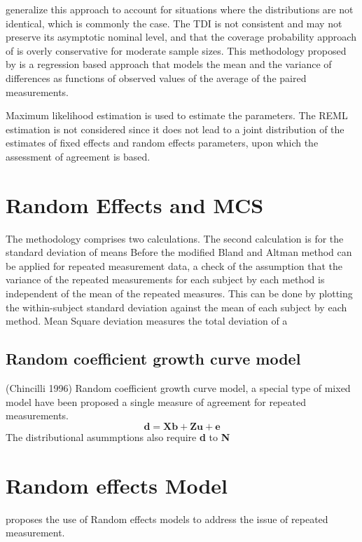 \documentclass[12pt, a4paper]{report}
\theoremstyle{plain}
\theoremstyle{definition}
\theoremstyle{remark}
\begin{document}
\newpage






\citet{pkcng} generalize this approach to account for situations
where the distributions are not identical, which is commonly the
case. The TDI is not consistent and may not preserve its
asymptotic nominal level, and that the coverage probability
approach of \citet{lin2002} is overly conservative for moderate
sample sizes. This methodology proposed by \citet{pkcng} is a
regression based approach that models the mean and the variance of
differences as functions of observed values of the average of the
paired measurements.

Maximum likelihood estimation is used to estimate the parameters.
The REML estimation is not considered since it does not lead to a
joint distribution of the estimates of fixed effects and random
effects parameters, upon which the assessment of agreement is
based.

\section{Random Effects and MCS}
The methodology comprises two calculations. The second calculation
is for the standard deviation of means Before the modified Bland
and Altman method can be applied for repeated measurement data, a
check of the assumption that the variance of the repeated
measurements for each subject by each method is independent of the
mean of the repeated measures. This can be done by plotting the
within-subject standard deviation against the mean of each subject
by each method. Mean Square deviation measures the total deviation
of a


\subsection{Random coefficient growth curve model} (Chincilli
1996) Random coefficient growth curve model, a special type of
mixed model have been proposed a single measure of agreement for
repeated measurements.
\begin{equation}
\textbf{d}= \textbf{Xb} + \textbf{Zu} + \textbf{e}
\end{equation}
The distributional asummptions also require \textbf{d} to
\textbf{N}


\section{Random effects Model} \citet{Myles} proposes the use of
Random effects models to address the issue of repeated
measurement. 
\end{document}
